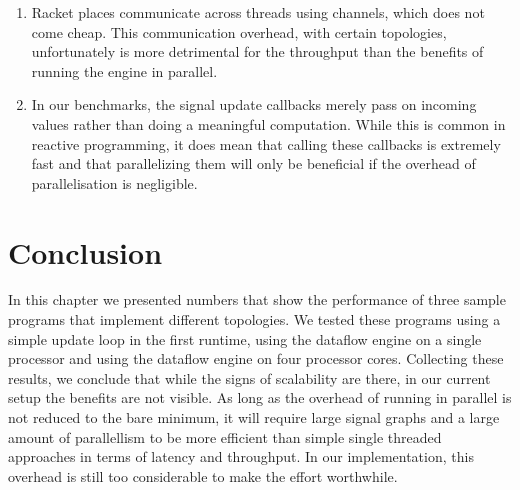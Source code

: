 \begin{enumerate}
	\item Racket places communicate across threads using channels, which does not come cheap. This communication overhead, with certain topologies, unfortunately is more detrimental for the throughput than the benefits of running the engine in parallel. 
	\item In our benchmarks, the signal update callbacks merely pass on incoming values rather than doing a meaningful computation. While this is common in reactive programming, it does mean that calling these callbacks is extremely fast and that parallelizing them will only be beneficial if the overhead of parallelisation is negligible. 
\end{enumerate}

\section{Conclusion}

In this chapter we presented numbers that show the performance of three sample programs that implement different topologies. We tested these programs using a simple update loop in the first runtime, using the dataflow engine on a single processor and using the dataflow engine on four processor cores. Collecting these results, we conclude that while the signs of scalability are there, in our current setup the benefits are not visible. As long as the overhead of running in parallel is not reduced to the bare minimum, it will require large signal graphs and a large amount of parallellism to be more efficient than simple single threaded approaches in terms of latency and throughput. In our implementation, this overhead is still too considerable to make the effort worthwhile. 




